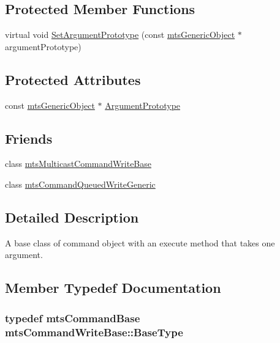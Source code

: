 \subsection*{Protected Member Functions}
\begin{DoxyCompactItemize}
\item 
virtual void \hyperlink{classmts_command_write_base_a1b369a356b5c2fb8ed3f5a72c3c521d1}{Set\+Argument\+Prototype} (const \hyperlink{classmts_generic_object}{mts\+Generic\+Object} $\ast$argument\+Prototype)
\end{DoxyCompactItemize}
\subsection*{Protected Attributes}
\begin{DoxyCompactItemize}
\item 
const \hyperlink{classmts_generic_object}{mts\+Generic\+Object} $\ast$ \hyperlink{classmts_command_write_base_a92e316a7f32f52a18b47a02867b104d2}{Argument\+Prototype}
\end{DoxyCompactItemize}
\subsection*{Friends}
\begin{DoxyCompactItemize}
\item 
class \hyperlink{classmts_command_write_base_a01bea616c1ae77f302ccedbbc1300c12}{mts\+Multicast\+Command\+Write\+Base}
\item 
class \hyperlink{classmts_command_write_base_aebd3531dc414cbd5c5aff710ecbfac4f}{mts\+Command\+Queued\+Write\+Generic}
\end{DoxyCompactItemize}


\subsection{Detailed Description}
A base class of command object with an execute method that takes one argument. 

\subsection{Member Typedef Documentation}
\hypertarget{classmts_command_write_base_a5d78c8590cfc73fa29d93b3678cba199}{}
\subsubsection[{Base\+Type}]{\setlength{\rightskip}{0pt plus 5cm}typedef {\bf mts\+Command\+Base} {\bf mts\+Command\+Write\+Base\+::\+Base\+Type}}\label{classmts_command_write_base_a5d78c8590cfc73fa29d93b3678cba199}


